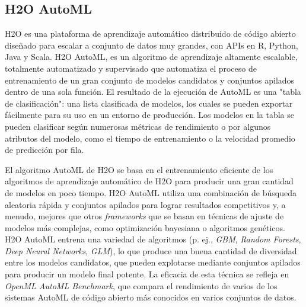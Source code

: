 \subsection{H2O AutoML}
H2O \parencite{73} es una plataforma de aprendizaje automático distribuido de código abierto diseñado para escalar a conjunto de datos muy grandes, con APIs en R, Python, Java y Scala. H2O AutoML, es un algoritmo de aprendizaje altamente escalable, totalmente automatizado y supervisado que automatiza el proceso de entrenamiento de un gran conjunto de modelos candidatos y conjuntos apilados dentro de una sola función. El resultado de la ejecución de AutoML es una "tabla de clasificación": una lista clasificada de modelos, los cuales se pueden exportar fácilmente para su uso en un entorno de producción. Los modelos en la tabla se pueden clasificar según numerosas métricas de rendimiento o por algunos atributos del modelo, como el tiempo de entrenamiento o la velocidad promedio de predicción por fila. 

El algoritmo AutoML de H2O se basa en el entrenamiento eficiente de los algoritmos de aprendizaje automático de H2O para producir una gran cantidad de modelos en poco tiempo. H2O AutoML utiliza una combinación de búsqueda aleatoria rápida y conjuntos apilados para lograr resultados competitivos y, a menudo, mejores que otros \textit{frameworks} que se basan en técnicas de ajuste de modelos más complejas, como optimización bayesiana o algoritmos genéticos. H2O AutoML entrena una variedad de algoritmos (p. ej., \textit{GBM}, \textit{Random Forests}, \textit{Deep Neural Networks}, \textit{GLM}), lo que produce una buena cantidad de diversidad entre los modelos candidatos, que pueden explotarse mediante conjuntos apilados para producir un modelo final potente. La eficacia de esta técnica se refleja en \textit{OpenML AutoML Benchmark}, que compara el rendimiento de varios de los sistemas AutoML de código abierto más conocidos en varios conjuntos de datos.

